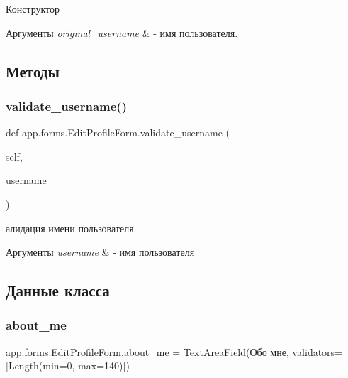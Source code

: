 Конструктор 


\begin{DoxyParams}{Аргументы}
{\em original\+\_\+username} & -\/ имя пользователя. \\
\hline
\end{DoxyParams}


\subsection{Методы}
\mbox{\label{classapp_1_1forms_1_1_edit_profile_form_ae6dab7354d6ef7902de30f80b3fdbdfb}} 
\subsubsection{\texorpdfstring{validate\+\_\+username()}{validate\_username()}}
{\footnotesize\ttfamily def app.\+forms.\+Edit\+Profile\+Form.\+validate\+\_\+username (\begin{DoxyParamCaption}\item[{}]{self,  }\item[{}]{username }\end{DoxyParamCaption})}



алидация имени пользователя. 


\begin{DoxyParams}{Аргументы}
{\em username} & -\/ имя пользователя \\
\hline
\end{DoxyParams}


\subsection{Данные класса}
\mbox{\label{classapp_1_1forms_1_1_edit_profile_form_ab4d1bb9524c5cbcf8326f4df8888d24f}} 
\subsubsection{\texorpdfstring{about\+\_\+me}{about\_me}}
{\footnotesize\ttfamily app.\+forms.\+Edit\+Profile\+Form.\+about\+\_\+me = Text\+Area\+Field(\textquotesingle{}Обо мне\textquotesingle{}, validators=\mbox{[}Length(min=0, max=140)\mbox{]})\hspace{0.3cm}{\ttfamily [static]}}

